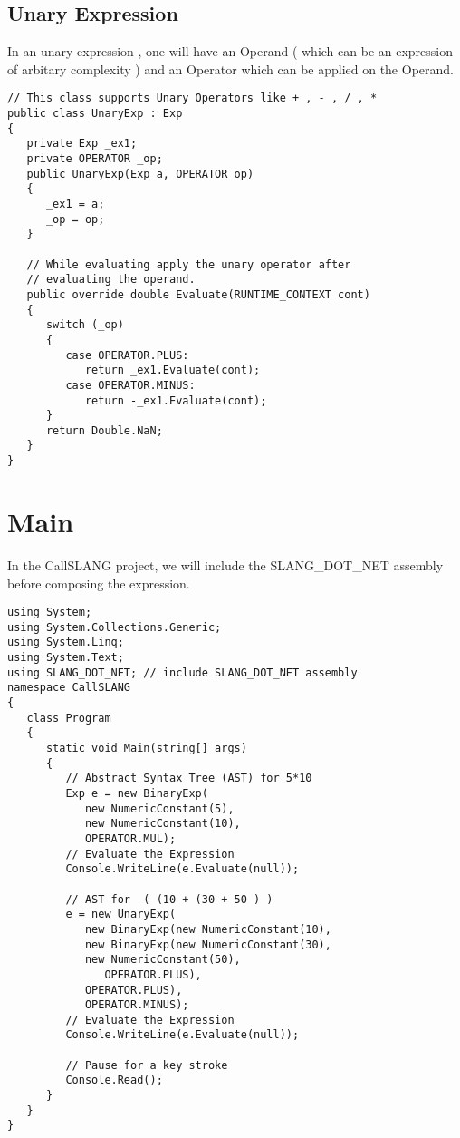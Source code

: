 \subsection{Unary Expression}
In an unary expression , one will have an Operand ( which can be an expression of arbitary complexity ) and an Operator which can be applied on the Operand.
\lstset{style=csharp}
\begin{lstlisting}
// This class supports Unary Operators like + , - , / , *
public class UnaryExp : Exp
{
   private Exp _ex1;
   private OPERATOR _op;
   public UnaryExp(Exp a, OPERATOR op)
   {
      _ex1 = a;
      _op = op;
   }

   // While evaluating apply the unary operator after 
   // evaluating the operand.
   public override double Evaluate(RUNTIME_CONTEXT cont)
   {
      switch (_op)
      {
         case OPERATOR.PLUS:
            return _ex1.Evaluate(cont);
         case OPERATOR.MINUS:
            return -_ex1.Evaluate(cont);
      }
      return Double.NaN;
   }
}
\end{lstlisting}
\clearpage 
\section{Main}
In the CallSLANG project, we will include the SLANG\_DOT\_NET assembly before composing the expression.
\\
\lstset{style=csharp}
\begin{lstlisting}
using System;
using System.Collections.Generic;
using System.Linq;
using System.Text;
using SLANG_DOT_NET; // include SLANG_DOT_NET assembly
namespace CallSLANG
{
   class Program
   {
      static void Main(string[] args)
      {
         // Abstract Syntax Tree (AST) for 5*10
         Exp e = new BinaryExp(
            new NumericConstant(5),
            new NumericConstant(10),
            OPERATOR.MUL);
         // Evaluate the Expression
         Console.WriteLine(e.Evaluate(null));

         // AST for -( (10 + (30 + 50 ) )
         e = new UnaryExp(
            new BinaryExp(new NumericConstant(10),
            new BinaryExp(new NumericConstant(30),
            new NumericConstant(50),
               OPERATOR.PLUS),
            OPERATOR.PLUS),
            OPERATOR.MINUS);
         // Evaluate the Expression
         Console.WriteLine(e.Evaluate(null));

         // Pause for a key stroke
         Console.Read();
      }
   } 
}
\end{lstlisting}
\clearpage 